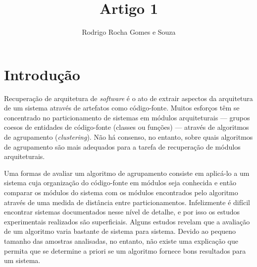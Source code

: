 \documentclass{acm_proc_article-sp}
\begin{document}
\title{Artigo 1} %
\author{Rodrigo Rocha Gomes e Souza}
\maketitle

\begin{abstract}



\end{abstract}

\section{Introdução} %

% 
% 

Recuperação de arquitetura de \emph{software} é o ato de extrair aspectos da arquitetura de um sistema através de artefatos como código-fonte. Muitos esforços têm se concentrado no particionamento de sistemas em módulos arquiteturais --- grupos coesos de entidades de código-fonte (classes ou funções) --- através de algoritmos de agrupamento (\emph{clustering}). Não há consenso, no entanto, sobre quais algoritmos de agrupamento são mais adequados para a tarefa de recuperação de módulos arquiteturais.

Uma formas de avaliar um algoritmo de agrupamento consiste em aplicá-lo a um sistema cuja organização do código-fonte em módulos seja conhecida e então comparar os módulos do sistema com os módulos encontrados pelo algoritmo através de uma medida de distância entre particionamentos. Infelizmente é difícil encontrar sistemas documentados nesse nível de detalhe, e por isso os estudos experimentais realizados são superficiais. Alguns estudos revelam que a avaliação de um algoritmo varia bastante de sistema para sistema. Devido ao pequeno tamanho das amostras analisadas, no entanto, não existe uma explicação que permita que se determine a priori se um algoritmo fornece bons resultados para um sistema.
\end{document}
